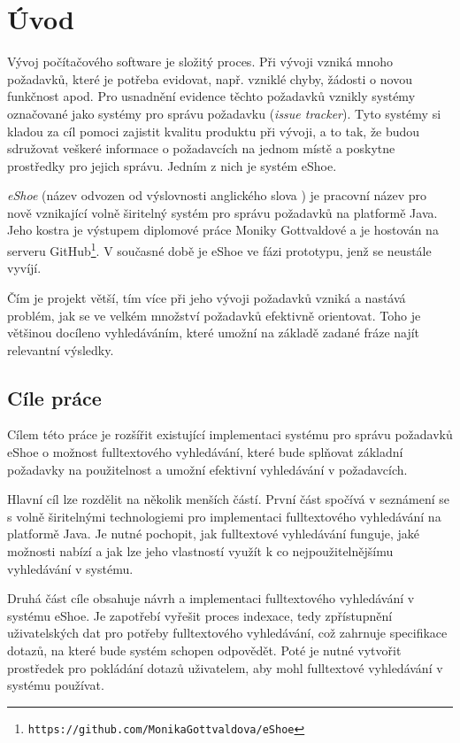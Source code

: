 \documentclass[11pt,oneside]{fithesis2}
\begin{document}
\chapter{Úvod}
Vývoj počítačového software je složitý proces. Při vývoji vzniká mnoho požadavků, které je potřeba evidovat, např. vzniklé chyby, žádosti o novou funkčnost apod. Pro usnadnění evidence těchto požadavků vznikly systémy označované jako systémy pro správu požadavku (\emph{issue tracker}). Tyto systémy si kladou za cíl pomoci zajistit kvalitu produktu při vývoji, a to tak, že budou sdružovat veškeré informace o požadavcích na jednom místě a poskytne prostředky pro jejich správu.  Jedním z nich je systém eShoe.

\emph{eShoe} (název odvozen od výslovnosti anglického slova ) je pracovní název pro nově vznikající volně širitelný systém pro správu požadavků na platformě Java. Jeho kostra je výstupem diplomové práce Moniky Gottvaldové \cite{eShoeDiplomka} a je hostován na serveru GitHub\footnote{\texttt{https://github.com/MonikaGottvaldova/eShoe}}. V současné době je eShoe ve fázi prototypu, jenž se neustále vyvíjí. 

Čím je projekt větší, tím více při jeho vývoji požadavků vzniká a nastává problém, jak se ve velkém množství požadavků efektivně orientovat. Toho je většinou docíleno vyhledáváním, které umožní na základě zadané fráze najít relevantní výsledky. 

\section{Cíle práce}
Cílem této práce je rozšířit existující implementaci systému pro správu požadavků eShoe o možnost fulltextového vyhledávání, které bude splňovat základní požadavky na použitelnost a umožní efektivní vyhledávání v požadavcích. 

Hlavní cíl lze rozdělit na několik menších částí. První část spočívá v seznámení se s volně širitelnými technologiemi pro implementaci fulltextového vyhledávání na platformě Java. Je nutné pochopit, jak fulltextové vyhledávání funguje, jaké možnosti nabízí a jak lze jeho vlastností využít k co nejpoužitelnějšímu vyhledávání v systému.

Druhá část cíle obsahuje návrh a implementaci fulltextového vyhledávání v systému eShoe. Je zapotřebí vyřešit proces indexace, tedy zpřístupnění uživatelských dat pro potřeby fulltextového vyhledávání, což zahrnuje specifikace dotazů, na které bude systém schopen odpovědět. Poté je nutné vytvořit prostředek pro pokládání dotazů uživatelem, aby mohl fulltextové vyhledávání v systému používat.
\end{document}
